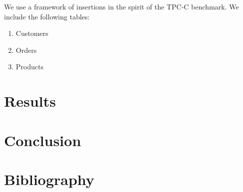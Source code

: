 \documentclass[twocolumn]{article}
\begin{document}
We use a framework of insertions in the spirit of the TPC-C benchmark. We include the following tables:

\begin{enumerate}
	\item Customers
	\item Orders
	\item Products
\end{enumerate} 


\section{Results}\label{results}


\section{Conclusion}



\section{Bibliography}

	
	
\end{document}

